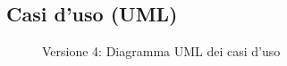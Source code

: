 \begin{landscape}
    \subsection{Casi d'uso (UML)}
    \vfill
    \begin{figure}[H]
        \centering
        \caption{Versione 4: Diagramma UML dei casi d'uso}
        \label{fig:use_case_uml_v4}
    \end{figure}
\end{landscape}